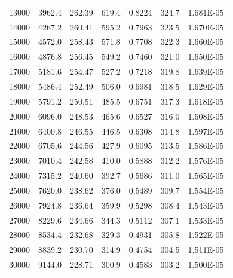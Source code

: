 \begin{table}[ht!]
\begin{tabular}{rrccccc}
        	13000	&	3962.4	&	262.39	&	619.4	&	0.8224	&	324.7	&	\num{1.681E-05}	\\
        	14000	&	4267.2	&	260.41	&	595.2	&	0.7963	&	323.5	&	\num{1.670E-05}	\\
        	15000	&	4572.0	&	258.43	&	571.8	&	0.7708	&	322.3	&	\num{1.660E-05}	\\
        	16000	&	4876.8	&	256.45	&	549.2	&	0.7460	&	321.0	&	\num{1.650E-05}	\\
        	17000	&	5181.6	&	254.47	&	527.2	&	0.7218	&	319.8	&	\num{1.639E-05}	\\
        	18000	&	5486.4	&	252.49	&	506.0	&	0.6981	&	318.5	&	\num{1.629E-05}	\\
        	19000	&	5791.2	&	250.51	&	485.5	&	0.6751	&	317.3	&	\num{1.618E-05}	\\
        	20000	&	6096.0	&	248.53	&	465.6	&	0.6527	&	316.0	&	\num{1.608E-05}	\\
        	21000	&	6400.8	&	246.55	&	446.5	&	0.6308	&	314.8	&	\num{1.597E-05}	\\
        	22000	&	6705.6	&	244.56	&	427.9	&	0.6095	&	313.5	&	\num{1.586E-05}	\\
        	23000	&	7010.4	&	242.58	&	410.0	&	0.5888	&	312.2	&	\num{1.576E-05}	\\
        	24000	&	7315.2	&	240.60	&	392.7	&	0.5686	&	311.0	&	\num{1.565E-05}	\\
        	25000	&	7620.0	&	238.62	&	376.0	&	0.5489	&	309.7	&	\num{1.554E-05}	\\
        	26000	&	7924.8	&	236.64	&	359.9	&	0.5298	&	308.4	&	\num{1.543E-05}	\\
        	27000	&	8229.6	&	234.66	&	344.3	&	0.5112	&	307.1	&	\num{1.533E-05}	\\
        	28000	&	8534.4	&	232.68	&	329.3	&	0.4931	&	305.8	&	\num{1.522E-05}	\\
        	29000	&	8839.2	&	230.70	&	314.9	&	0.4754	&	304.5	&	\num{1.511E-05}	\\
        	30000	&	9144.0	&	228.71	&	300.9	&	0.4583	&	303.2	&	\num{1.500E-05}	\\

\end{tabular}
\end{table}
